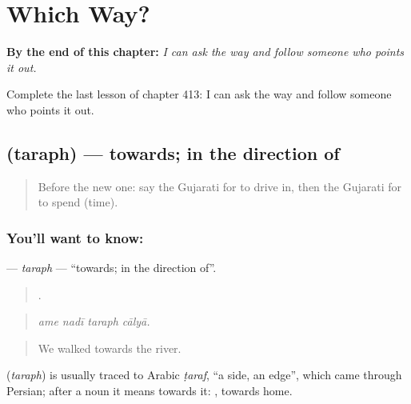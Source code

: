 
\chapter{Which Way?}
\label{ch:gu-which-way}

\begin{chapteropening}
\textbf{By the end of this chapter:} \emph{I can ask the way and follow someone who points it out.}

Complete the last lesson of chapter 413: I can ask the way and follow someone who points it out.
\end{chapteropening}

\section[\texorpdfstring{\gu{તરફ} (taraph)}{તરફ (taraph)}]{ (taraph) — towards; in the direction of}

\label{lesson:GU-C413-taraph}



\begin{quote}
Before the new one: say the Gujarati for to drive in, then the Gujarati for to spend (time).
\end{quote}

\subsection*{You'll want to know: }
\textbf{} — \emph{taraph} — \textquotedblleft{}towards; in the direction of\textquotedblright{}.

\begin{quote}
   .
\end{quote}

\begin{quote}
\emph{ame nadī taraph cālyā.}
\end{quote}

\begin{quote}
We walked towards the river.
\end{quote}

\begin{cousinweb}
\textbf{} (\emph{taraph}) is usually traced to Arabic \emph{ṭaraf}, \textquotedblleft{}a side, an edge\textquotedblright{}, which came through Persian; after a noun it means towards it:  , towards home.
\end{cousinweb}

